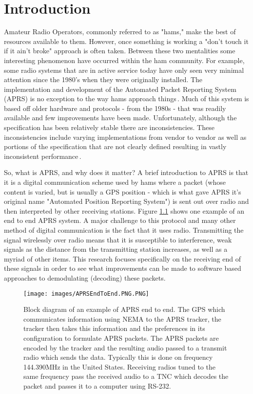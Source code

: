 \chapter{Introduction}

Amateur Radio Operators, commonly referred to as "hams," make the best of resources available to them. However, once something is working a "don't touch it if it ain't broke" approach is often taken. Between these two mentalities some interesting phenomenon have occurred within the ham community. For example, some radio systems that are in active service today have only seen very minimal attention since the 1980's when they were originally installed. The implementation and development of the Automated Packet Reporting System (APRS) is no exception to the way hams approach things\,\cite{Bruninga}. Much of this system is based off older hardware and protocols - from the 1980s - that was readily available and few improvements have been made. Unfortunately, although the specification has been relatively stable there are inconsistencies. These inconsistencies include varying implementations from vendor to vendor as well as portions of the specification that are not clearly defined resulting in vastly inconsistent performance\,\cite{KWFThesis, KWFTAPR}.

So, what is APRS, and why does it matter? A brief introduction to APRS is that it is a digital communication scheme used by hams where a packet (whose content is varied, but is usually a GPS position - which is what gave APRS it's original name "Automated Position Reporting System"\cite{WikiAPRS}) is sent out over radio and then interpreted by other receiving stations. Figure \ref{APRSEndToEnd.PNG} shows one example of an end to end APRS system. A major challenge to this protocol and many other method of digital communication is the fact that it uses radio. Transmitting the signal wirelessly over radio means that it is susceptible to interference, weak signals as the distance from the transmitting station increases, as well as a myriad of other items. This research focuses specifically on the receiving end of these signals in order to see what improvements can be made to software based approaches to demodulating (decoding) these packets.

\begin{figure}
  \centering
	\texttt{[image: images/APRSEndToEnd.PNG.PNG]} 
	\caption{Block diagram of an example of APRS end to end. The GPS which communicates information using NEMA to the APRS tracker, the tracker then takes this information and the preferences in its configuration to formulate APRS packets. The APRS packets are encoded by the tracker and the resulting audio passed to a transmit radio which sends the data. Typically this is done on frequency 144.390MHz in the United States. Receiving radios tuned to the same frequency pass the received audio to a TNC which decodes the packet and passes it to a computer using RS-232.}
   \label{APRSEndToEnd.PNG}
\end{figure}

